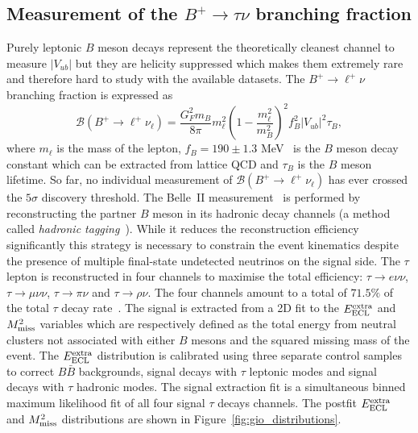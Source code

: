 \documentclass{moriond}
\def\vub{V_{ub}}
\def\eecl{E_{\rm ECL}^{\rm extra}}
\def\mmiss{M_{\rm miss}^2}
\begin{document}
\subsection{Measurement of the $B^+ \to \tau \nu$ branching fraction}
Purely leptonic $B$ meson decays represent the theoretically cleanest channel to measure $|\vub|$ but they are helicity suppressed which makes them extremely rare and therefore hard to study with the available datasets. The $B^+ \to \ell^+ \nu$ branching fraction is expressed as
\begin{equation}
    \mathcal{B}(B^+ \to \ell^+\nu_\ell) = \frac{G_F^2m_B}{8\pi}m_\ell^2\left( 1 - \frac{m_\ell^2}{m_B^2} \right)^2 f_B^2|V_{ub}|^2\tau_B,
\end{equation}
where $m_\ell$ is the mass of the lepton, $f_B = 190 \pm 1.3$ MeV~\cite{flag} is the $B$ meson decay constant which can be extracted from lattice QCD and $\tau_B$ is the $B$ meson lifetime. So far, no individual measurement of $\mathcal{B}(B^+ \to \ell^+\nu_\ell)$ has ever crossed the $5\sigma$ discovery threshold. The Belle~II measurement~\cite{gio} is performed by reconstructing the partner $B$ meson in its hadronic decay channels (a method called \textit{hadronic tagging}~\cite{fei}). While it reduces the reconstruction efficiency significantly this strategy is necessary to constrain the event kinematics despite the presence of multiple final-state undetected neutrinos on the signal side. The $\tau$ lepton is reconstructed in four channels to maximise the total efficiency: $\tau \to e\nu\nu$, $\tau \to \mu\nu\nu$, $\tau \to \pi\nu$ and $\tau \to \rho\nu$. The four channels amount to a total of $71.5\%$ of the total $\tau$ decay rate~\cite{pdg}. The signal is extracted from a 2D fit to the $\eecl$ and $\mmiss$ variables which are respectively defined as the total energy from neutral clusters not associated with either $B$ mesons and the squared missing mass of the event. The $\eecl$ distribution is calibrated using three separate control samples to correct $B\bar{B}$ backgrounds, signal decays with $\tau$ leptonic modes and signal decays with $\tau$ hadronic modes. The signal extraction fit is a simultaneous binned maximum likelihood fit of all four signal $\tau$ decays channels. The postfit $\eecl$ and $\mmiss$ distributions are shown in Figure~\ref{fig:gio_distributions}.
\end{document}
